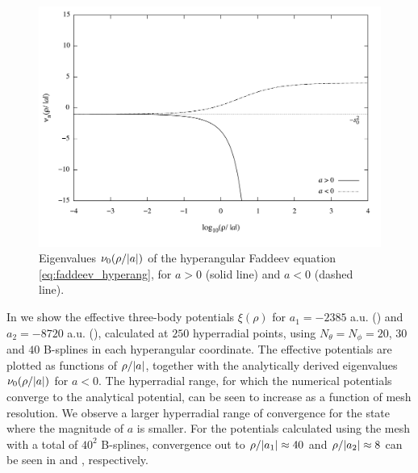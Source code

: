 \begin{figure}
	\includegraphics[width=\linewidth]{faddeev.pdf}
	\caption{Eigenvalues $\nu_0(\rho/\lvert a\rvert)$ of the hyperangular Faddeev equation \eqref{eq:faddeev_hyperang}, for $a>0$ (solid line) and $a<0$ (dashed line).}
	\label{fig:faddeev}
\end{figure}

In  we show the effective three-body potentials $\xi(\rho)$ for $a_1=-2385$ a.u. () and $a_2=-8720$ a.u. (), calculated at $250$ hyperradial points, using $N_{\theta} = N_{\phi} = 20$, $30$ and $40$ B-splines in each hyperangular coordinate. The effective potentials are plotted as functions of $\rho/\lvert a\rvert$, together with the analytically derived eigenvalues $\nu_0(\rho/\lvert a\rvert)$ for $a<0$. The hyperradial range, for which the numerical potentials converge to the analytical potential, can be seen to increase as a function of mesh resolution. We observe a larger hyperradial range of convergence for the state where the magnitude of $a$ is smaller. For the potentials calculated using the mesh with a total of $40^2$ B-splines, convergence out to $\rho/\lvert a_1\rvert \approx 40$ and $\rho/\lvert a_2\rvert \approx 8$ can be seen in  and , respectively.  

